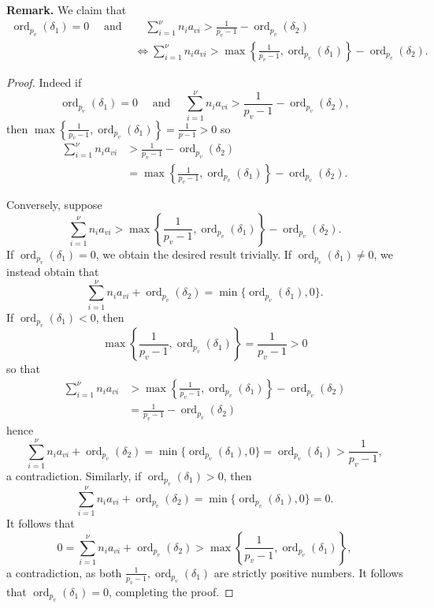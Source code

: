 \documentclass[11pt]{report}
\theoremstyle{definition}
\DeclareMathOperator{\ord}{ord}
\begin{document}
\textbf{Remark.} We claim that
\begin{align*} \ord_{p_v}(\delta_1) = 0 \quad \text{ and } &  \quad \displaystyle \sum_{i = 1}^{\nu} n_{i}a_{vi} > \frac{1}{p_v-1} - \ord_{p_v}(\delta_2)  \\
&  \iff \sum_{i = 1}^{\nu} n_{i}a_{vi} > \max\left\{\frac{1}{p_v-1},\ord_{p_v}(\delta_1)\right\} - \ord_{p_v}(\delta_2).
\end{align*}
\begin{proof}
  Indeed if
  \[\ord_{p_v}(\delta_1) = 0 \quad \text{ and } \quad \displaystyle \sum_{i = 1}^{\nu} n_{i}a_{vi}
    > \frac{1}{p_v-1} - \ord_{p_v}(\delta_2),\]
  then $\max\left\{\frac{1}{p_v-1},\ord_{p_v}(\delta_1)\right\} = \frac{1}{p-1} > 0$ so
  \begin{align*}
    \sum_{i = 1}^{\nu} n_{i}a_{vi}
    & > \frac{1}{p_v-1} - \ord_{p_v}(\delta_2)\\
    & = \max\left\{\frac{1}{p_v-1},\ord_{p_v}(\delta_1)\right\} - \ord_{p_v}(\delta_2).
  \end{align*}

  Conversely, suppose
  \[\sum_{i = 1}^{\nu} n_{i}a_{vi} > \max\left\{\frac{1}{p_v-1},\ord_{p_v}(\delta_1)\right\} - \ord_{p_v}(\delta_2).\]
  If $\ord_{p_v}(\delta_1) = 0$, we obtain the desired result trivially. If $\ord_{p_v}(\delta_1) \neq 0$, we instead obtain that
  \[\sum_{i = 1}^{\nu} n_{i}a_{vi} + \ord_{p_v}(\delta_2) = \min\{\ord_{p_v}(\delta_1),0\}.\]
  If $\ord_{p_v}(\delta_1) < 0$, then
  \[\max\left\{\frac{1}{p_v-1},\ord_{p_v}(\delta_1)\right\} = \frac{1}{p_v-1} > 0 \]
  so that
  \begin{align*}
    \sum_{i = 1}^{\nu} n_{i}a_{vi}
    & > \max\left\{\frac{1}{p_v-1},\ord_{p_v}(\delta_1)\right\} - \ord_{p_v}(\delta_2)\\
    & = \frac{1}{p_v-1} - \ord_{p_v}(\delta_2)
  \end{align*}
  hence
  \[\sum_{i = 1}^{\nu} n_{i}a_{vi} + \ord_{p_v}(\delta_2) = \min\{\ord_{p_v}(\delta_1),0\} = \ord_{p_v}(\delta_1) > \frac{1}{p_v-1},\]
  a contradiction.
  Similarly, if $\ord_{p_v}(\delta_1) > 0$, then
  \[\sum_{i = 1}^{\nu} n_{i}a_{vi} + \ord_{p_v}(\delta_2) = \min\{\ord_{p_v}(\delta_1),0\} = 0.\]
  It follows that
  \[ 0 = \sum_{i = 1}^{\nu} n_{i}a_{vi} + \ord_{p_v}(\delta_2)
    > \max\left\{\frac{1}{p_v-1},\ord_{p_v}(\delta_1)\right\},\]
  a contradiction, as both $\frac{1}{p_v-1},\ord_{p_v}(\delta_1)$ are strictly positive numbers.
  It follows that $\ord_{p_v}(\delta_1) = 0$, completing the proof.
\end{proof}
\end{document}
